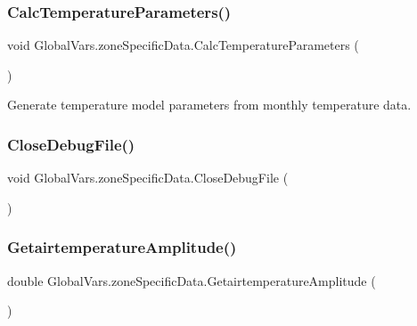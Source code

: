 \subsubsection{\texorpdfstring{CalcTemperatureParameters()}{CalcTemperatureParameters()}}
{\footnotesize\ttfamily void Global\+Vars.\+zone\+Specific\+Data.\+Calc\+Temperature\+Parameters (\begin{DoxyParamCaption}{ }\end{DoxyParamCaption})\hspace{0.3cm}{\ttfamily [inline]}}



Generate temperature model parameters from monthly temperature data. 

\mbox{\label{struct_global_vars_1_1zone_specific_data_a073364a6434d45e728cfec31993dbdf2}} 
\subsubsection{\texorpdfstring{CloseDebugFile()}{CloseDebugFile()}}
{\footnotesize\ttfamily void Global\+Vars.\+zone\+Specific\+Data.\+Close\+Debug\+File (\begin{DoxyParamCaption}{ }\end{DoxyParamCaption})\hspace{0.3cm}{\ttfamily [inline]}}

\mbox{\label{struct_global_vars_1_1zone_specific_data_abe8d04141904b2f25c221ff6e61baa85}} 
\subsubsection{\texorpdfstring{GetairtemperatureAmplitude()}{GetairtemperatureAmplitude()}}
{\footnotesize\ttfamily double Global\+Vars.\+zone\+Specific\+Data.\+Getairtemperature\+Amplitude (\begin{DoxyParamCaption}{ }\end{DoxyParamCaption})\hspace{0.3cm}{\ttfamily [inline]}}

